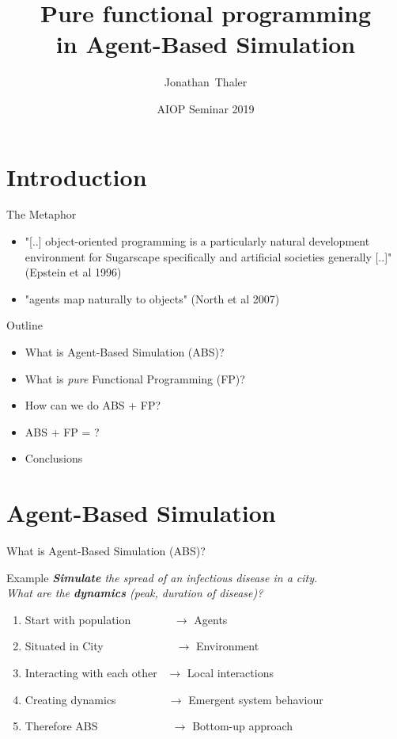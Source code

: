 \documentclass{beamer} %
\title[Pure functional programming in Agent-Based Simulation] 
{%
  Pure functional programming \\ in Agent-Based Simulation
}
\author[Thaler]
{
  Jonathan~Thaler
}
\institute[University of Nottingham, Ningbo, China]
{
  University of Nottingham, Ningbo, China
}
\date[AIOP Seminar 2019]
{AIOP Seminar 2019}
\begin{document}
\begin{frame}
  \titlepage
\end{frame}

\section{Introduction}
\begin{frame}{The Metaphor}
\begin{itemize}
  \item "[..] object-oriented programming is a particularly natural development environment for Sugarscape specifically and artificial societies generally [..]" (Epstein et al 1996)
  
  \item "agents map naturally to objects" (North et al 2007)
\end{itemize}
\end{frame}

\begin{frame}{Outline}
\begin{itemize}
  \item What is Agent-Based Simulation (ABS)?
  
  \item What is \textit{pure} Functional Programming (FP)?
  
  \item How can we do ABS + FP?  
  
  \item ABS + FP = ?
  
  \item Conclusions
\end{itemize}
\end{frame}

\section{Agent-Based Simulation}
\begin{frame}{What is Agent-Based Simulation (ABS)?} 
  \begin{block}{Example}
    \textit{\textbf{Simulate} the spread of an infectious disease in a city. \\ What are the \textbf{dynamics} (peak, duration of disease)?}
  \end{block}
  
  \begin{enumerate}
    \item Start with population \, \, \, \, \, \, \, $\to$ Agents
 	\item Situated in City \, \, \, \, \, \, \, \, \, \, \, \,\, $\to$ Environment
 	\item Interacting with each other \, $\to$ Local interactions
 	\item Creating dynamics \, \, \, \, \, \, \, \,\,\, $\to$ Emergent system behaviour
 	\item Therefore ABS \, \, \, \, \, \, \, \, \, \, \, \,\,\, $\to$ Bottom-up approach
  \end{enumerate}
\end{frame}
\end{document}
